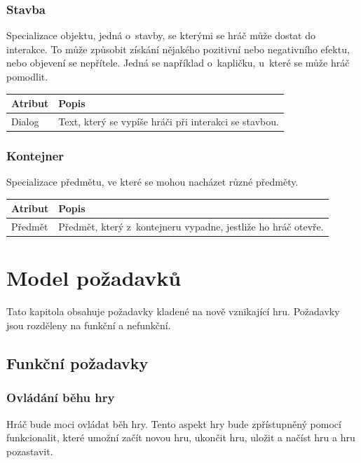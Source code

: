 \documentclass[12pt,a4paper]{article}
\begin{document}
\subsubsection{Stavba}
Specializace objektu, jedná o~stavby, se kterými se hráč může dostat do
interakce. To může způsobit získání nějakého pozitivní nebo negativního efektu,
nebo objevení se nepřítele. Jedná se například o~kapličku, u~které se může hráč
pomodlit.

\noindent
\begin{tabularx}{\textwidth}{|l|>{\raggedright}X|}
\hline
\cellcolor{black!80}\textcolor{gray!25}{\textbf{Atribut}} & \cellcolor{black!80}\textcolor{gray!20}{\textbf{Popis}}\tabularnewline \hline
 Dialog & Text, který se vypíše hráči při interakci se stavbou.
\tabularnewline\hline
\end{tabularx}

\subsubsection{Kontejner}
Specializace předmětu, ve které se mohou nacházet různé předměty.

\noindent
\begin{tabularx}{\textwidth}{|l|>{\raggedright}X|}
\hline
\cellcolor{black!80}\textcolor{gray!25}{\textbf{Atribut}} & \cellcolor{black!80}\textcolor{gray!20}{\textbf{Popis}}\tabularnewline \hline
 Předmět & Předmět, který z~kontejneru vypadne, jestliže ho hráč
  otevře.
\tabularnewline\hline
\end{tabularx}

\newpage

\section{Model požadavků}
Tato kapitola obsahuje požadavky kladené na nově vznikající hru. Požadavky jsou
rozděleny na funkční a nefunkční.

\subsection{Funkční požadavky}

\subsubsection{Ovládání běhu hry}
Hráč bude moci ovládat běh hry. Tento aspekt hry bude zpřístupněný pomocí
funkcionalit, které umožní začít novou hru, ukončit hru, uložit a načíst hru a
hru pozastavit.
\end{document}

